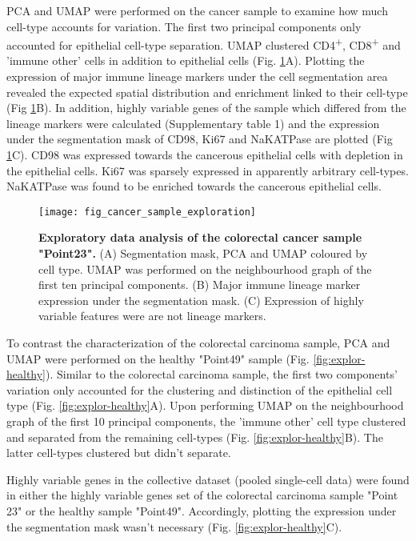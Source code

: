 PCA and UMAP were performed on the cancer sample to examine how much cell-type accounts for variation. The first two principal components only accounted for epithelial cell-type separation. UMAP clustered CD4\textsuperscript{+}, CD8\textsuperscript{+} and 'immune other' cells in addition to epithelial cells (Fig. \ref{fig:explor-cancer}A). Plotting the expression of major immune lineage markers under the cell segmentation area revealed the expected spatial distribution and enrichment linked to their cell-type (Fig \ref{fig:explor-cancer}B). In addition, highly variable genes of the sample which differed from the lineage markers were calculated (Supplementary table 1) and the expression under the segmentation mask of CD98, Ki67 and NaKATPase are plotted (Fig \ref{fig:explor-cancer}C). CD98 was expressed towards the cancerous epithelial cells with depletion in the epithelial cells. Ki67 was sparsely expressed in apparently arbitrary cell-types. NaKATPase was found to be enriched towards the cancerous epithelial cells.

\begin{figure}[p]
    \centering
    \texttt{[image: fig\_cancer\_sample\_exploration]}
    \caption{\textbf{Exploratory data analysis of the colorectal cancer sample "Point23".} (A) Segmentation mask, PCA and UMAP coloured by cell type. UMAP was performed on the neighbourhood graph of the first ten principal components. (B) Major immune lineage marker expression under the segmentation mask. (C) Expression of highly variable features were are not lineage markers.}
    \label{fig:explor-cancer}
\end{figure}

To contrast the characterization of the colorectal carcinoma sample, PCA and UMAP were performed on the healthy "Point49" sample (Fig. \ref{fig:explor-healthy}). Similar to the colorectal carcinoma sample, the first two components' variation only accounted for the clustering and distinction of the epithelial cell type (Fig. \ref{fig:explor-healthy}A). Upon performing UMAP on the neighbourhood graph of the first 10 principal components, the 'immune other' cell type clustered and separated from the remaining cell-types (Fig. \ref{fig:explor-healthy}B). The latter cell-types clustered but didn't separate.

Highly variable genes in the collective dataset (pooled single-cell data) were found in either the highly variable genes set of the colorectal carcinoma sample "Point 23" or the healthy sample "Point49". Accordingly, plotting the expression under the segmentation mask wasn't necessary (Fig. \ref{fig:explor-healthy}C).

